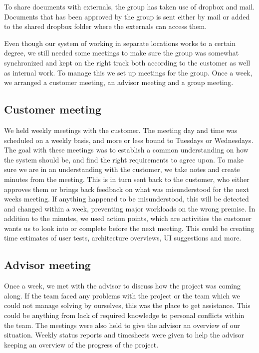 \documentclass[11pt]{book}
\begin{document}
To share documents with externals, the group has taken use of dropbox and mail. Documents that has been approved by the group is sent either by mail or added to the shared dropbox folder where the externals can access them.

Even though our system of working in separate locations works to a certain degree, we still needed some meetings to make sure the group was somewhat synchronized and kept on the right track both according to the customer as well as internal work.
To manage this we set up meetings for the group. Once a week, we arranged a customer meeting, an advisor meeting and a group meeting.

\subsection{Customer meeting}
We held weekly meetings with the customer. The meeting day and time was scheduled on a weekly basis, and more or less bound to Tuesdays or Wednesdays. The goal with these meetings was to establish a common understanding on how the system should be, and find the right requirements to agree upon. To make sure we are in an understanding with the customer, we take notes and create minutes from the meeting. This is in turn sent back to the customer, who either approves them or brings back feedback on what was misunderstood for the next weeks meeting. If anything happened to be misunderstood, this will be detected and changed within a week, preventing major workloads on the wrong premise. In addition to the minutes, we used action points, which are activities the customer wants us to look into or complete before the next meeting. This could be creating time estimates of user tests, architecture overviews, UI suggestions and more.

\subsection{Advisor meeting}
Once a week, we met with the advisor to discuss how the project was coming along. If the team faced any problems with the project or the team which we could not manage solving by ourselves, this was the place to get assistance. This could be anything from lack of required knowledge to personal conflicts within the team. The meetings were also held to give the advisor an overview of our situation. Weekly status reports and timesheets were given to help the advisor keeping an overview of the progress of the project.
\end{document}
